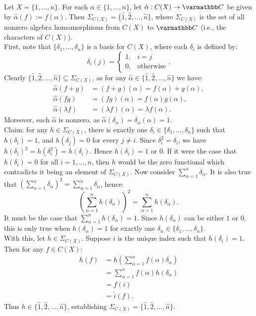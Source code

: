 \documentclass[preview, border=12pt]{standalone}
\begin{document}
Let $X = \{1,\ldots ,n\}$. For each $\alpha \in \{1,\ldots ,n\}$, let $\hat{\alpha}:C(X) \rightarrow \bfC$ be given by $\hat{\alpha}(f) := f(\alpha)$. Then $\Sigma_{C(X)} = \{\hat{1},\hat{2},\ldots ,\hat{n}\}$, where $\Sigma_{C(X)}$ is the set of all nonzero algebra homomorphisms from $C(X)$ to $\bfC$ (i.e., the characters of $C(X)$). \\

First, note that $\{\delta_1,\ldots ,\delta_n\}$ is a basis for $C(X)$, where each $\delta_i$ is defined by:
\[
	\delta_i(j) = \begin{cases} 1, & i = j\\ 0, & \text{otherwise}\end{cases}.
\] 
Clearly $\{\hat{1},\hat{2},\ldots ,\hat{n}\} \subseteq \Sigma_{C(X)}$, as for any $\hat{\alpha} \in \{\hat{1},\hat{2},\ldots ,\hat{n}\}$ we have:
\begin{align*}
	\hat{\alpha}(f+g) &= (f+g)(\alpha) = f(\alpha) + g(\alpha), \\
	\hat{\alpha}(fg) &= (fg)(\alpha) = f(\alpha) g(\alpha), \\
	\hat{\alpha}(\lambda f) &= (\lambda f)(\alpha) = \lambda f(\alpha).
\end{align*}
Moreover, each $\hat{\alpha}$ is nonzero, as $\hat{\alpha}(\delta_\alpha) = \delta_\alpha(\alpha) = 1$. \\

Claim: for any $h \in \Sigma_{C(X)}$, there is exactly one $\delta_i \in \{\delta_1,\ldots ,\delta_n\}$ such that $h(\delta_i) = 1$, and $h(\delta_j) = 0$ for every $j \neq i$. Since $\delta_i^2 = \delta_i$, we have $h(\delta_i)^2 = h(\delta_i^2) = h(\delta_i)$. Hence $h(\delta_i) = 1$ or $0$. If it were the case that $h(\delta_i) = 0$ for all $i = 1,\ldots ,n$, then $h$ would be the zero functional which contradicts it being an element of $\Sigma_{C(X)}$. Now consider $\sum_{\alpha = 1}^{n} \delta_\alpha$. It is also true that $\left(\sum_{\alpha = 1}^{n} \delta_\alpha\right)^2 = \sum_{\alpha =1}^{n} \delta_\alpha$, hence:
\[
	\left( \sum_{\alpha = 1}^{n} h(\delta_\alpha) \right)^2 = \sum_{\alpha = 1}^{n} h(\delta_\alpha).
\]
It must be the case that $\sum_{\alpha = 1}^{n} h(\delta_\alpha) = 1$. Since $h(\delta_\alpha)$ can be either $1$ or $0$, this is only true when $h(\delta_\alpha) = 1$ for exactly one $\delta_\alpha \in \{\delta_1,\ldots ,\delta_n\}$. \\

With this, let $h \in \Sigma_{C(X)}$. Suppose $i$ is the unique index such that $h(\delta_i) = 1$. Then for any $f \in C(X)$:
\begin{align*}
	h(f)
	&= h \left( \sum_{\alpha = 1}^{n}f(\alpha)\delta_\alpha  \right)  \\
	&= \sum_{\alpha = 1}^{n} f(\alpha)h(\delta_\alpha) \\
	&= f(i) \\
	&= \hat{i}(f).
\end{align*}
Thus $h \in \{\hat{1},\hat{2},\ldots ,\hat{n}\}$, establishing $\Sigma_{C(X)} = \{\hat{1},\hat{2},\ldots ,\hat{n}\}$.
\end{document}
